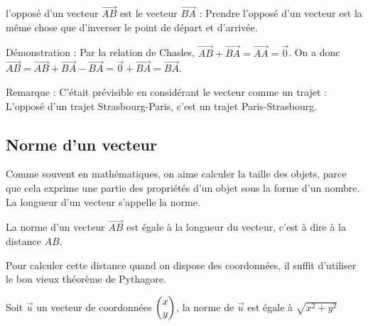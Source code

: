 \documentclass[10pt,a4paper,oneside]{book}
\begin{document}
\begin{prop}
  l'opposé d'un vecteur $\overrightarrow{AB}$ est le vecteur $\overrightarrow{BA}$ : Prendre l'opposé d'un vecteur est la même chose que d'inverser le point de départ et d'arrivée. 
\end{prop}

Démonstration : Par la relation de Chasles, $\overrightarrow{AB} + \overrightarrow{BA} = \overrightarrow{AA} = \overrightarrow{0}$. On a donc $\overrightarrow{AB} = \overrightarrow{AB} + \overrightarrow{BA} - \overrightarrow{BA} = \overrightarrow{0} + \overrightarrow{BA} = \overrightarrow{BA}$.

Remarque : C'était prévisible en considérant le vecteur comme un trajet : L'opposé d'un trajet Strasbourg-Paris, c'est un trajet Paris-Strasbourg.  

\subsection{Norme d'un vecteur}

Comme souvent en mathématiques, on aime calculer la taille des objets, parce que cela exprime une partie des propriétés d'un objet sous la forme d'un nombre. La longueur d'un vecteur s'appelle la norme.

\begin{de}
  La norme d'un vecteur $\overrightarrow{AB}$ est égale à la longueur du vecteur, c'est à dire à la distance $AB$.
\end{de}

Pour calculer cette distance quand on dispose des coordonnées, il suffit d'utiliser le bon vieux théorème de Pythagore.

\begin{prop}
  Soit $\overrightarrow{u}$ un vecteur de coordonnées $ \begin{pmatrix} x\\ y \end{pmatrix}$, la norme de $\overrightarrow{u}$ est égale à $\sqrt{x^2+y^2}$
\end{prop}
\end{document}
